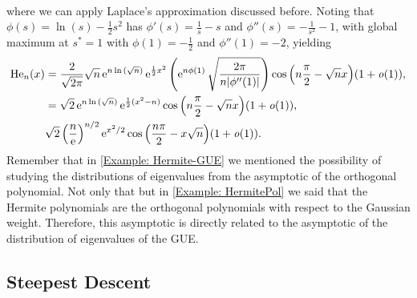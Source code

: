 \begin{exemplo}
\begin{align}
	\end{align}
	where we can apply Laplace's approximation discussed before. Noting that $\phi(s) = \ln{(s)} - \frac{1}{2}s^2$ has $\phi'(s) = \frac{1}{s} - s$ and $\phi''(s) = -\frac{1}{s^2} - 1$, with global maximum at $s^* = 1$ with $\phi(1) = -\frac{1}{2}$ and $\phi''(1) = -2$, yielding
	\begin{align}
		\mathrm{He}_n(x) & = \frac{2}{\sqrt{2\pi}} \sqrt{n} \operatorname{e}^{n\ln{(\sqrt{n})}} \operatorname{e}^{\frac{1}{2}x^2}  \left( \operatorname{e}^{n\phi(1)} \sqrt{\frac{2\pi}{n|\phi''(1)|}} \right) \cos{\left(n\frac{\pi}{2} - \sqrt{n}x\right)} (1+\mathit{o}(1)), \\
		& = \sqrt{2} \operatorname{e}^{n \ln{(\sqrt{n})}} \operatorname{e}^{\frac{1}{2}(x^2 - n)} \cos{\left(n\frac{\pi}{2} - \sqrt{n}x\right)} (1+\mathit{o}(1)), \\
		& \sqrt{2} \left(\frac{n}{\operatorname{e}}\right)^{n/2} \operatorname{e}^{x^2/2} \cos{\left(\frac{n\pi}{2} - x \sqrt{n}\right)} (1 + \mathit{o}(1)).
	\end{align}
	Remember that in \autoref{Example: Hermite-GUE} we mentioned the possibility of studying the distributions of eigenvalues from the asymptotic of the orthogonal polynomial. Not only that but in \autoref{Example: HermitePol} we said that the Hermite polynomials are the orthogonal polynomials with respect to the Gaussian weight. Therefore, this asymptotic is directly related to the asymptotic of the distribution of eigenvalues of the GUE.
\end{exemplo}

\subsection{Steepest Descent}

